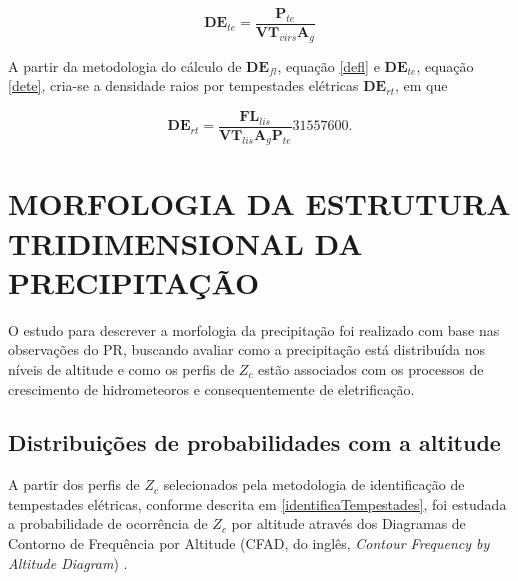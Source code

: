 
\begin{equation}
\mathbf{DE}_{te} = \frac{\mathbf{P}_{te}}{\mathbf{VT}_{virs} \mathbf{A}_g}    
\label{dete}
\end{equation}

A partir da metodologia do cálculo de $\mathbf{DE}_{fl}$, equação \ref{defl} e $\mathbf{DE}_{te}$, equação \ref{dete}, cria-se a densidade raios por tempestades elétricas $\mathbf{DE}_{rt}$, em que 

\begin{equation}
\mathbf{DE}_{rt} = \frac{\mathbf{FL}_{lis}}{\mathbf{VT}_{lis} \mathbf{A}_g\mathbf{P}_{te}} 31557600.  
\label{dert}
\end{equation}



\section{MORFOLOGIA DA ESTRUTURA TRIDIMENSIONAL DA PRECIPITAÇÃO}
\label{metodologiaPrec3D}

O estudo para descrever a morfologia da precipitação foi realizado com base nas observações do PR, buscando avaliar como a precipitação está distribuída nos níveis de altitude e como os perfis de $Z_c$ estão associados com os processos de crescimento de hidrometeoros e consequentemente de eletrificação.  

\subsection{Distribuições de probabilidades com a altitude}

A partir dos perfis de $Z_c$ selecionados pela metodologia de identificação de tempestades elétricas, conforme descrita em \ref{identificaTempestades}, foi estudada a probabilidade de ocorrência de $Z_c$ por altitude através dos Diagramas de Contorno de Frequência por Altitude (CFAD, do inglês, \textit{Contour Frequency by Altitude Diagram}) \cite{yuter1995}.

